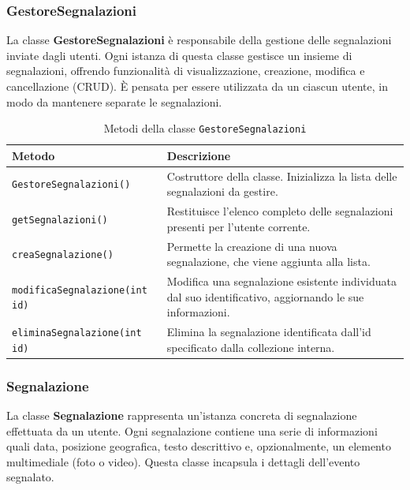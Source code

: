 \subsubsection{GestoreSegnalazioni}

La classe \textbf{GestoreSegnalazioni} è responsabile della gestione delle segnalazioni inviate dagli utenti. Ogni istanza di questa classe gestisce un insieme di segnalazioni, offrendo funzionalità di visualizzazione, creazione, modifica e cancellazione (CRUD). È pensata per essere utilizzata da un ciascun utente, in modo da mantenere separate le segnalazioni.

\begin{table}[H]
\centering
\begin{tabularx}{\textwidth}{|l|X|}
\hline
\textbf{Metodo} & \textbf{Descrizione} \\
\hline
\texttt{GestoreSegnalazioni()} & Costruttore della classe. Inizializza la lista delle segnalazioni da gestire. \\
\hline
\texttt{getSegnalazioni()} & Restituisce l’elenco completo delle segnalazioni presenti per l’utente corrente. \\
\hline
\texttt{creaSegnalazione()} & Permette la creazione di una nuova segnalazione, che viene aggiunta alla lista. \\
\hline
\texttt{modificaSegnalazione(int id)} & Modifica una segnalazione esistente individuata dal suo identificativo, aggiornando le sue informazioni. \\
\hline
\texttt{eliminaSegnalazione(int id)} & Elimina la segnalazione identificata dall’id specificato dalla collezione interna. \\
\hline
\end{tabularx}
\caption{Metodi della classe \texttt{GestoreSegnalazioni}}
\end{table}

\subsubsection{Segnalazione}

La classe \textbf{Segnalazione} rappresenta un’istanza concreta di segnalazione effettuata da un utente. Ogni segnalazione contiene una serie di informazioni quali data, posizione geografica, testo descrittivo e, opzionalmente, un elemento multimediale (foto o video). Questa classe incapsula i dettagli dell’evento segnalato.

